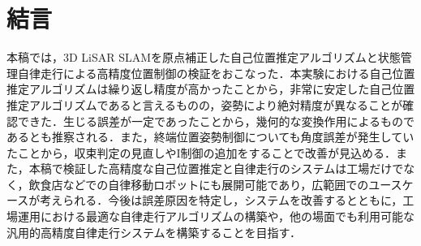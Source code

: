 \section{結言}
本稿では，3D LiSAR SLAMを原点補正した自己位置推定アルゴリズムと状態管理自律走行による高精度位置制御の検証をおこなった．本実験における自己位置推定アルゴリズムは繰り返し精度が高かったことから，非常に安定した自己位置推定アルゴリズムであると言えるものの，姿勢により絶対精度が異なることが確認できた．生じる誤差が一定であったことから，幾何的な変換作用によるものであるとも推察される．また，終端位置姿勢制御についても角度誤差が発生していたことから，収束判定の見直しやI制御の追加をすることで改善が見込める．また，本稿で検証した高精度な自己位置推定と自律走行のシステムは工場だけでなく，飲食店などでの自律移動ロボットにも展開可能であり，広範囲でのユースケースが考えられる．今後は誤差原因を特定し，システムを改善するとともに，工場運用における最適な自律走行アルゴリズムの構築や，他の場面でも利用可能な汎用的高精度自律走行システムを構築することを目指す．
